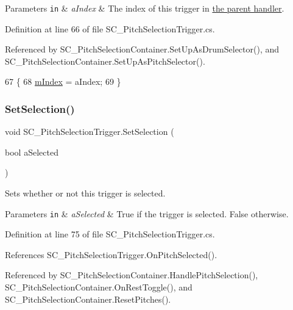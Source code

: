 \begin{DoxyParams}[1]{Parameters}
\mbox{\tt in}  & {\em a\+Index} & The index of this trigger in \hyperlink{group___doc_s_c___p_s_c}{the parent handler}. \\
\hline
\end{DoxyParams}


Definition at line 66 of file S\+C\+\_\+\+Pitch\+Selection\+Trigger.\+cs.



Referenced by S\+C\+\_\+\+Pitch\+Selection\+Container.\+Set\+Up\+As\+Drum\+Selector(), and S\+C\+\_\+\+Pitch\+Selection\+Container.\+Set\+Up\+As\+Pitch\+Selector().


\begin{DoxyCode}
67     \{
68         \hyperlink{group___s_c___p_s_t_priv_var_ga7d7771170c1f6cb1d6a9eb41e96a478f}{mIndex} = aIndex;
69     \}
\end{DoxyCode}
\mbox{\label{group___s_c___p_s_t_pub_func_ga267db9aed38ba33ad44c26c84a1757df}} 
\subsubsection{\texorpdfstring{Set\+Selection()}{SetSelection()}}
{\footnotesize\ttfamily void S\+C\+\_\+\+Pitch\+Selection\+Trigger.\+Set\+Selection (\begin{DoxyParamCaption}\item[{bool}]{a\+Selected }\end{DoxyParamCaption})}



Sets whether or not this trigger is selected. 


\begin{DoxyParams}[1]{Parameters}
\mbox{\tt in}  & {\em a\+Selected} & True if the trigger is selected. False otherwise. \\
\hline
\end{DoxyParams}


Definition at line 75 of file S\+C\+\_\+\+Pitch\+Selection\+Trigger.\+cs.



References S\+C\+\_\+\+Pitch\+Selection\+Trigger.\+On\+Pitch\+Selected().



Referenced by S\+C\+\_\+\+Pitch\+Selection\+Container.\+Handle\+Pitch\+Selection(), S\+C\+\_\+\+Pitch\+Selection\+Container.\+On\+Rest\+Toggle(), and S\+C\+\_\+\+Pitch\+Selection\+Container.\+Reset\+Pitches().


